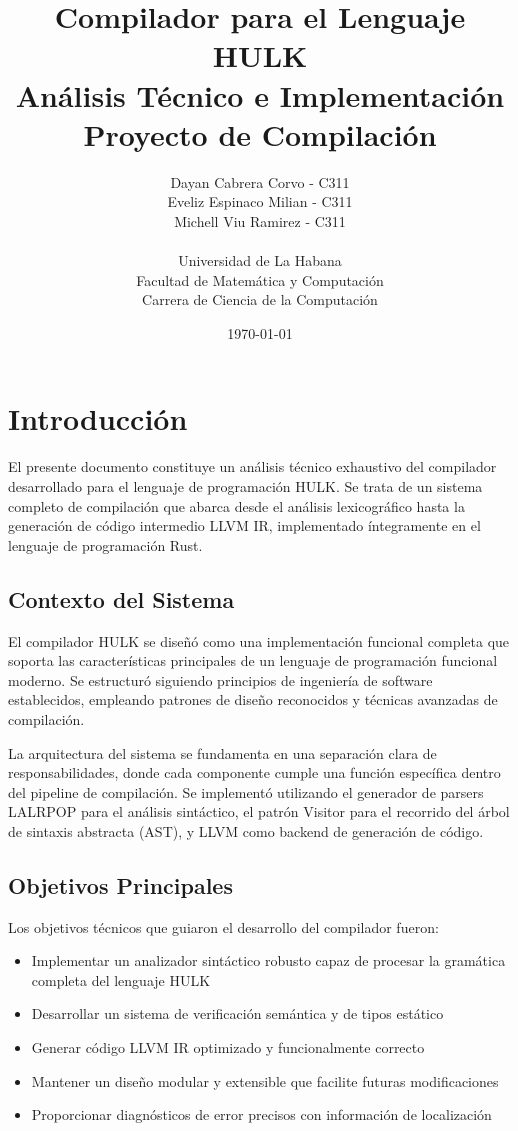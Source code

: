 \documentclass[12pt,a4paper]{article}
\title{
    \vspace{2cm}
    {\Huge\textbf{Compilador para el Lenguaje HULK}}\\
    \vspace{0.5cm}
    {\Large Análisis Técnico e Implementación}\\
    \vspace{0.5cm}
    {\large Proyecto de Compilación}\\
    \vspace{1cm}
}
\author{
    Dayan Cabrera Corvo - C311\\
    Eveliz Espinaco Milian - C311\\
    Michell Viu Ramirez - C311\\
    \\
    Universidad de La Habana\\
    Facultad de Matemática y Computación\\
    Carrera de Ciencia de la Computación
}
\date{\today}
\begin{document}
\maketitle
\thispagestyle{empty}
\newpage

\tableofcontents
\newpage

\section{Introducción}

El presente documento constituye un análisis técnico exhaustivo del compilador desarrollado para el lenguaje de programación HULK. Se trata de un sistema completo de compilación que abarca desde el análisis lexicográfico hasta la generación de código intermedio LLVM IR, implementado íntegramente en el lenguaje de programación Rust.

\subsection{Contexto del Sistema}

El compilador HULK se diseñó como una implementación funcional completa que soporta las características principales de un lenguaje de programación funcional moderno. Se estructuró siguiendo principios de ingeniería de software establecidos, empleando patrones de diseño reconocidos y técnicas avanzadas de compilación.

La arquitectura del sistema se fundamenta en una separación clara de responsabilidades, donde cada componente cumple una función específica dentro del pipeline de compilación. Se implementó utilizando el generador de parsers LALRPOP para el análisis sintáctico, el patrón Visitor para el recorrido del árbol de sintaxis abstracta (AST), y LLVM como backend de generación de código.

\subsection{Objetivos Principales}

Los objetivos técnicos que guiaron el desarrollo del compilador fueron:

\begin{itemize}
    \item Implementar un analizador sintáctico robusto capaz de procesar la gramática completa del lenguaje HULK
    \item Desarrollar un sistema de verificación semántica y de tipos estático
    \item Generar código LLVM IR optimizado y funcionalmente correcto
    \item Mantener un diseño modular y extensible que facilite futuras modificaciones
    \item Proporcionar diagnósticos de error precisos con información de localización
\end{itemize}
\end{document}

